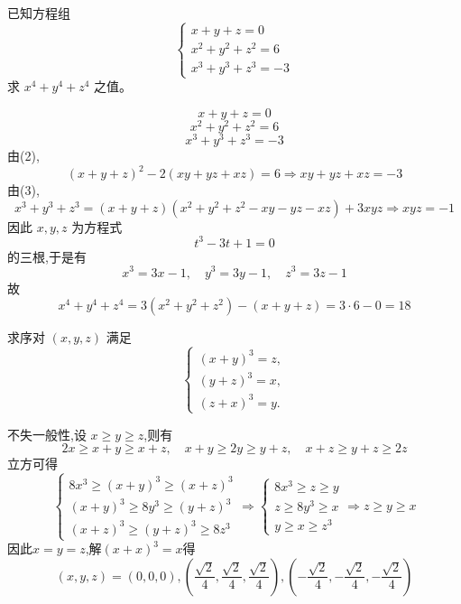 \begin{questions}
    \question 已知方程组
    \[
    \begin{cases}
    x+y+z=0 \\
    x^2+y^2+z^2=6 \\
    x^3+y^3+z^3=-3
    \end{cases}
    \]
    求 $x^4+y^4+z^4$ 之值。
    \begin{solution}
        \[
        x+y+z=0 \tag{1}
        \]
        \[
        x^2+y^2+z^2=6 \tag{2}
        \]
        \[
        x^3+y^3+z^3=-3 \tag{3}
        \]
        由(2),
        \[
        (x+y+z)^2 - 2(xy+yz+xz) = 6 \Rightarrow xy+yz+xz = -3
        \]
        由(3),
        \[
        x^3+y^3+z^3 = (x+y+z)(x^2+y^2+z^2 - xy - yz - xz) + 3xyz \Rightarrow xyz = -1
        \]
        因此 $x,y,z$ 为方程式
        \[
        t^3 - 3t + 1 = 0
        \]
        的三根,于是有
        \[
        x^3=3x-1,\quad y^3=3y-1,\quad z^3=3z-1
        \]
        故
        \[
        x^4+y^4+z^4 = 3(x^2+y^2+z^2) - (x+y+z) = 3\cdot 6 - 0 = 18
        \]
    \end{solution}

    \question 求序对 $(x,y,z)$ 满足
    \[
    \begin{cases}
    (x+y)^3 = z,\\
    (y+z)^3 = x,\\
    (z+x)^3 = y.
    \end{cases}
    \]
    \begin{solution}
        不失一般性,设 $x \ge y \ge z$,则有
        \[
        2x \ge x+y \ge x+z, \quad x+y \ge 2y\ge y+z, \quad x+z \ge y+z \ge 2z
        \]
        立方可得
        \[
        \begin{cases}
        8x^3\ge (x+y)^3 \ge (x+z)^3\\
        (x+y)^3 \ge 8y^3 \ge (y+z)^3\\
        (x+z)^3 \ge (y+z)^3 \ge 8z^3
        \end{cases}
        \Rightarrow
        \begin{cases}
        8x^3\ge z \ge y\\
        z \ge 8y^3 \ge x\\
        y \ge x \ge z^3
        \end{cases}
        \Rightarrow z \ge y \ge x
        \]
        因此$x=y=z$,解$(x+x)^3=x$得
        \[
        (x,y,z)=(0,0,0),\left(\frac{\sqrt2}{4},\frac{\sqrt2}{4},\frac{\sqrt2}{4}\right),\left(-\frac{\sqrt2}{4},-\frac{\sqrt2}{4},-\frac{\sqrt2}{4}\right)
        \]
    \end{solution}




\end{questions}

